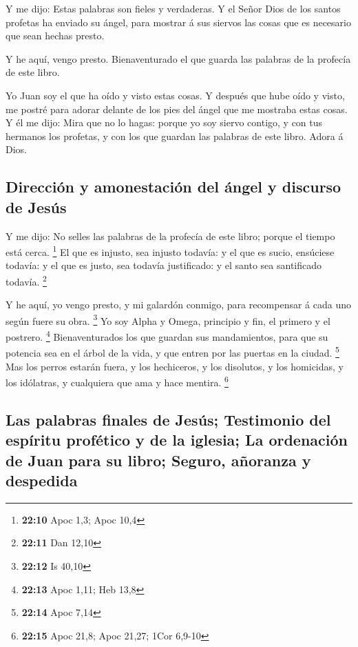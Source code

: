  Y me dijo: Estas palabras son fieles y verdaderas. Y el
Señor Dios de los santos profetas ha enviado su ángel, para mostrar á
sus siervos las cosas que es necesario que sean hechas presto.

 Y he aquí, vengo presto. Bienaventurado el que guarda las
palabras de la profecía de este libro.

 Yo Juan soy el que ha oído y visto estas cosas. Y después
que hube oído y visto, me postré para adorar delante de los pies del
ángel que me mostraba estas cosas.  Y él me dijo: Mira que
no lo hagas: porque yo soy siervo contigo, y con tus hermanos los
profetas, y con los que guardan las palabras de este libro. Adora á
Dios.

\hypertarget{direcciuxf3n-y-amonestaciuxf3n-del-uxe1ngel-y-discurso-de-jesuxfas}{%
\subsection{Dirección y amonestación del ángel y discurso de
Jesús}\label{direcciuxf3n-y-amonestaciuxf3n-del-uxe1ngel-y-discurso-de-jesuxfas}}

 Y me dijo: No selles las palabras de la profecía de este
libro; porque el tiempo está cerca. \footnote{\textbf{22:10} Apoc 1,3;
  Apoc 10,4}  El que es injusto, sea injusto todavía: y
el que es sucio, ensúciese todavía: y el que es justo, sea todavía
justificado: y el santo sea santificado todavía. \footnote{\textbf{22:11}
  Dan 12,10}

 Y he aquí, yo vengo presto, y mi galardón conmigo, para
recompensar á cada uno según fuere su obra. \footnote{\textbf{22:12} Is
  40,10}  Yo soy Alpha y Omega, principio y fin, el
primero y el postrero. \footnote{\textbf{22:13} Apoc 1,11; Heb 13,8}
 Bienaventurados los que guardan sus mandamientos, para
que su potencia sea en el árbol de la vida, y que entren por las puertas
en la ciudad. \footnote{\textbf{22:14} Apoc 7,14}  Mas
los perros estarán fuera, y los hechiceros, y los disolutos, y los
homicidas, y los idólatras, y cualquiera que ama y hace mentira.
\footnote{\textbf{22:15} Apoc 21,8; Apoc 21,27; 1Cor 6,9-10}

\hypertarget{las-palabras-finales-de-jesuxfas-testimonio-del-espuxedritu-profuxe9tico-y-de-la-iglesia-la-ordenaciuxf3n-de-juan-para-su-libro-seguro-auxf1oranza-y-despedida}{%
\subsection{Las palabras finales de Jesús; Testimonio del espíritu
profético y de la iglesia; La ordenación de Juan para su libro; Seguro,
añoranza y
despedida}\label{las-palabras-finales-de-jesuxfas-testimonio-del-espuxedritu-profuxe9tico-y-de-la-iglesia-la-ordenaciuxf3n-de-juan-para-su-libro-seguro-auxf1oranza-y-despedida}}

